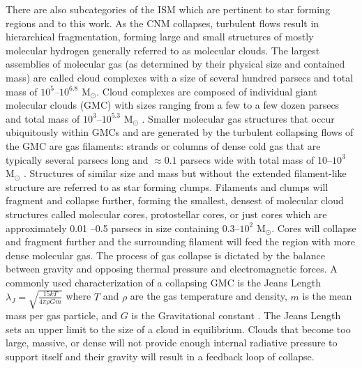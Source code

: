 \documentclass[twoside]{drexel-thesis}
\begin{document}
\begin{thesis}
There are also subcategories of the ISM which are pertinent to star forming regions and to this work. As the CNM collapses, turbulent flows result in hierarchical fragmentation, forming large and small structures of mostly molecular hydrogen generally referred to as molecular clouds. The largest assemblies of molecular gas (as determined by their physical size and contained mass) are called cloud complexes with a size of several hundred parsecs and total mass of $10^5$--$10^{6.8}$ M$_\odot$. Cloud complexes are composed of individual giant molecular clouds (GMC) with sizes ranging from a few to a few dozen parsecs and total mass of $10^3$--$10^{5.3}$ M$_\odot$ \citep{draine_2011}. Smaller molecular gas structures that occur ubiquitously within GMCs and are generated by the turbulent collapsing flows of the GMC are gas filaments: strands or columns of dense cold gas that are typically several parsecs long and $\approx0.1$ parsecs wide with total mass of 10--$10^3$ M$_\odot$ \citep{arzoumanian_characterizing_2011,peretto_sdc13_2014}. Structures of similar size and mass but without the extended filament-like structure are referred to as star forming clumps. Filaments and clumps will fragment and collapse further, forming the smallest, densest of molecular cloud structures called molecular cores, protostellar cores, or just cores which are approximately 0.01 --0.5 parsecs in size containing $0.3$--$10^2$ M$_\odot$. Cores will collapse and fragment further and the surrounding filament will feed the region with more dense molecular gas. The process of gas collapse is dictated by the balance between gravity and opposing thermal pressure and electromagnetic forces. A commonly used characterization of a collapsing GMC is the Jeans Length $\lambda_{J} = \sqrt{\frac{15kT}{4\pi\rho Gm}}$ where $T$ and $\rho$ are the gas temperature and density, $m$ is the mean mass per gas particle, and $G$ is the Gravitational constant \citep{truelove_jeans_1997-1}. The Jeans Length sets an upper limit to the size of a cloud in equilibrium. Clouds that become too large, massive, or dense will not provide enough internal radiative pressure to support itself and their gravity will result in a feedback loop of collapse. 


\end{thesis}
\end{document}
